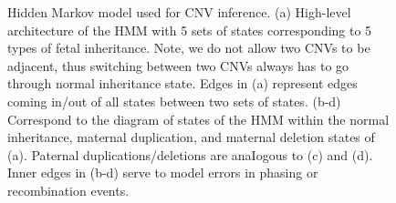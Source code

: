 \begin{figure}[h]
\caption{Hidden Markov model used for CNV inference. (a) High-level architecture of the HMM with 5 sets of states corresponding to 5 types of fetal inheritance. Note, we do not allow two CNVs to be adjacent, thus switching between two CNVs always has to go through normal inheritance state. Edges in (a) represent edges coming in/out of all states between two sets of states. (b-d) Correspond to the diagram of states of the HMM within the normal inheritance, maternal duplication, and maternal deletion states of (a). Paternal duplications/deletions are anaIogous to (c) and (d). Inner edges in (b-d) serve to model errors in phasing or recombination events.}\label{fig:hmm_main}
\end{figure}


